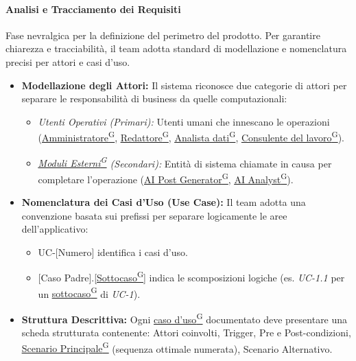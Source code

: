 \documentclass[a4paper,12pt]{article}
\providecommand{\glslink}[2]{\href{https://alittlebyte-19.github.io/Documentazione/glossario.html\#gls-#1}{\underline{#2}\textsuperscript{\scriptsize G}}}
\begin{document}
\paragraph{Analisi e Tracciamento dei Requisiti}
Fase nevralgica per la definizione del perimetro del prodotto. Per garantire chiarezza e tracciabilità, il team adotta standard di modellazione e nomenclatura precisi per attori e casi d'uso.

\begin{itemize}
    \item \textbf{Modellazione degli Attori:} Il sistema riconosce due categorie di attori per separare le responsabilità di business da quelle computazionali:
    \begin{itemize}
        \item \textit{Utenti Operativi (Primari):} Utenti umani che innescano le operazioni (\glslink{amministratore}{Amministratore}, \glslink{redattore}{Redattore}, \glslink{analista-dati}{Analista dati}, \glslink{consulente-del-lavoro-cdl}{Consulente del lavoro}).
        \item \textit{\glslink{moduli-esterni}{Moduli Esterni} (Secondari):} Entità di sistema chiamate in causa per completare l'operazione (\glslink{ai-post-generator}{AI Post Generator}, \glslink{ai-analyst}{AI Analyst}).
    \end{itemize}
    \item \textbf{Nomenclatura dei Casi d'Uso (Use Case):} Il team adotta una convenzione basata sui prefissi per separare logicamente le aree dell'applicativo:
    \begin{itemize}
        \item UC-[Numero] identifica i casi d'uso.
        \item {} [Caso Padre].[\glslink{sottocaso}{Sottocaso}] indica le scomposizioni logiche (es. \textit{UC-1.1} per un \glslink{sottocaso}{sottocaso} di \textit{UC-1}).
    \end{itemize}
    \item \textbf{Struttura Descrittiva:} Ogni \glslink{caso-d-uso-uc}{caso d'uso} documentato deve presentare una scheda strutturata contenente: Attori coinvolti, Trigger, Pre e Post-condizioni, \glslink{scenario-principale}{Scenario Principale} (sequenza ottimale numerata), Scenario Alternativo.
\end{itemize}
\end{document}
